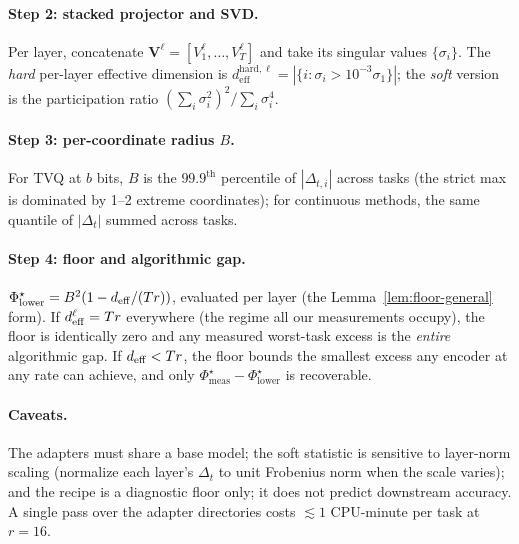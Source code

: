 \paragraph{Step 2: stacked projector and SVD.} Per layer,
concatenate $\mathbf{V}^\ell = [V_1^\ell, \dots, V_T^\ell]$ and take
its singular values $\{\sigma_i\}$. The \emph{hard} per-layer effective
dimension is $d_{\mathrm{eff}}^{\mathrm{hard},\ell} = |\{i : \sigma_i >
10^{-3}\sigma_1\}|$; the \emph{soft} version is the participation ratio
$(\sum_i \sigma_i^2)^2 / \sum_i \sigma_i^4$.

\paragraph{Step 3: per-coordinate radius $B$.} For TVQ at $b$ bits,
$B$ is the $99.9^{\mathrm{th}}$ percentile of $|\Delta_{t,i}|$ across
tasks (the strict max is dominated by 1--2 extreme coordinates); for
continuous methods, the same quantile of $|\Delta_t|$ summed across
tasks.

\paragraph{Step 4: floor and algorithmic gap.}
$\Phi^\star_{\mathrm{lower}} = B^2(1 - d_{\mathrm{eff}}/(Tr))$, evaluated per
layer (the Lemma~\ref{lem:floor-general} form). If
$d_{\mathrm{eff}}^\ell = Tr$ everywhere (the regime all our measurements occupy),
the floor is identically zero and any measured worst-task excess is
the \emph{entire} algorithmic gap. If $d_{\mathrm{eff}} < Tr$, the floor bounds
the smallest excess any encoder at any rate can achieve, and only
$\Phi^\star_{\mathrm{meas}} - \Phi^\star_{\mathrm{lower}}$ is
recoverable.

\paragraph{Caveats.} The adapters must share a base model; the soft
statistic is sensitive to layer-norm scaling (normalize each layer's
$\Delta_t$ to unit Frobenius norm when the scale varies); and the
recipe is a diagnostic floor only; it does not predict downstream
accuracy. A single pass over the adapter directories costs
$\lesssim 1$ CPU-minute per task at $r = 16$.

